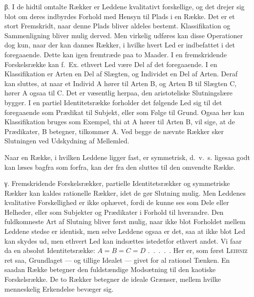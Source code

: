 \documentclass[12pt]{article}
\begin{document}
β. I de hidtil omtalte Rækker er Leddene kvalitativt forskellige, og det drejer
sig blot om deres indbyrdes Forhold med Hensyn til Plads i en Række. Det er et
stort Fremskridt, naar denne Plads bliver aldeles bestemt. Klassifikation og
Sammenligning bliver mulig derved. Men virkelig udføres kan disse Operationer
dog kun, naar der kan dannes Rækker, i hvilke hvert Led er indbefattet i det
foregaaende. Dette kan igen fremtræde paa to Maader. I en fremskridende
Forskelsrække kan f.~Ex. ethvert Led være Del af det foregaaende. I en
Klassifikation er Arten en Del af Slægten, og Individet en Del af Arten. Deraf
kan sluttes, at naar et Individ A hører til Arten B, og Arten B til Slægten C,
hører A ogsaa til C. Det er væsentlig herpaa, den aristoteliske Slutningslære
bygger. I en partiel Identitetsrække forholder det følgende Led sig til det
foregaaende som Prædikat til Subjekt, eller som Følge til Grund. Ogsaa her kan
Klassifikation bruges som Exempel, thi at A hører til Arten B, vil sige, at de
Prædikater, B betegner, tilkommer A. Ved begge de nævnte Rækker sker
Slutningen ved Udskydning af Mellemled.

Naar en Række, i hvilken Leddene ligger fast, er symmetrisk, d.~v.~s. ligesaa
godt kan læses bagfra som forfra, kan der fra den sluttes til den omvendte
Række.

γ. Fremskridende Forskelsrækker, partielle Identitetsrækker og symmetriske
Rækker kan kaldes rationelle Rækker, idet de gør Slutning mulig. Men Leddenes
kvalitative Forskellighed er ikke ophævet, fordi de kunne ses som Dele eller
Helheder, eller som Subjekter og Prædikater i Forhold til hverandre. Den
fuldkomneste Art af Slutning bliver først mulig, naar ikke blot Forholdet
mellem Leddene stedse er identisk, men selve Leddene ogsaa er det, saa at ikke
blot Led kan skydes ud, men ethvert Led kan indsættes istedetfor ethvert andet.
Vi faar da en absolut
Identitetsrække: $A = B = C = D$ .~.~.~.~. Her er, som først \textsc{Leibniz}
ret saa, Grundlaget --- og tillige Idealet --- givet for al rationel Tænken. En
saadan Række betegner den fuldstændige Modsætning til den kaotiske
Forskelsrække. De to Rækker betegner de ideale Grænser, mellem hvilke
menneskelig Erkendelse bevæger sig.
\end{document}
